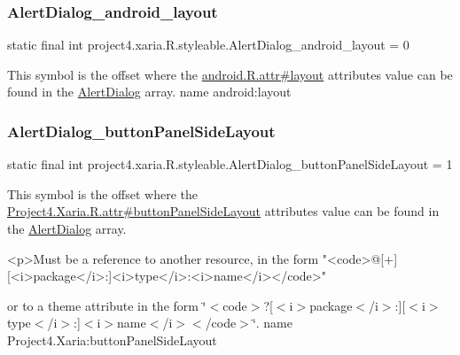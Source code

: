\subsubsection{\texorpdfstring{Alert\+Dialog\+\_\+android\+\_\+layout}{AlertDialog\_android\_layout}}
{\footnotesize\ttfamily static final int project4.\+xaria.\+R.\+styleable.\+Alert\+Dialog\+\_\+android\+\_\+layout = 0\hspace{0.3cm}{\ttfamily [static]}}

This symbol is the offset where the \hyperlink{}{android.\+R.\+attr\#layout} attribute\textquotesingle{}s value can be found in the \hyperlink{classproject4_1_1xaria_1_1R_1_1styleable_a03310da91bbeadbad8196e09427a2ba7}{Alert\+Dialog} array.  name android\+:layout \mbox{\label{classproject4_1_1xaria_1_1R_1_1styleable_a1833a885cce0614ceaed95c1792d8bb6}} 
\subsubsection{\texorpdfstring{Alert\+Dialog\+\_\+button\+Panel\+Side\+Layout}{AlertDialog\_buttonPanelSideLayout}}
{\footnotesize\ttfamily static final int project4.\+xaria.\+R.\+styleable.\+Alert\+Dialog\+\_\+button\+Panel\+Side\+Layout = 1\hspace{0.3cm}{\ttfamily [static]}}

This symbol is the offset where the \hyperlink{}{Project4.\+Xaria.\+R.\+attr\#button\+Panel\+Side\+Layout} attribute\textquotesingle{}s value can be found in the \hyperlink{classproject4_1_1xaria_1_1R_1_1styleable_a03310da91bbeadbad8196e09427a2ba7}{Alert\+Dialog} array.

\begin{DoxyVerb}      <p>Must be a reference to another resource, in the form "<code>@[+][<i>package</i>:]<i>type</i>:<i>name</i></code>"
\end{DoxyVerb}
 or to a theme attribute in the form \char`\"{}$<$code$>$?\mbox{[}$<$i$>$package$<$/i$>$\+:\mbox{]}\mbox{[}$<$i$>$type$<$/i$>$\+:\mbox{]}$<$i$>$name$<$/i$>$$<$/code$>$\char`\"{}.  name Project4.\+Xaria\+:button\+Panel\+Side\+Layout \mbox{\label{classproject4_1_1xaria_1_1R_1_1styleable_ab18f2ebca215c3b56455c5bf016daed3}} 
